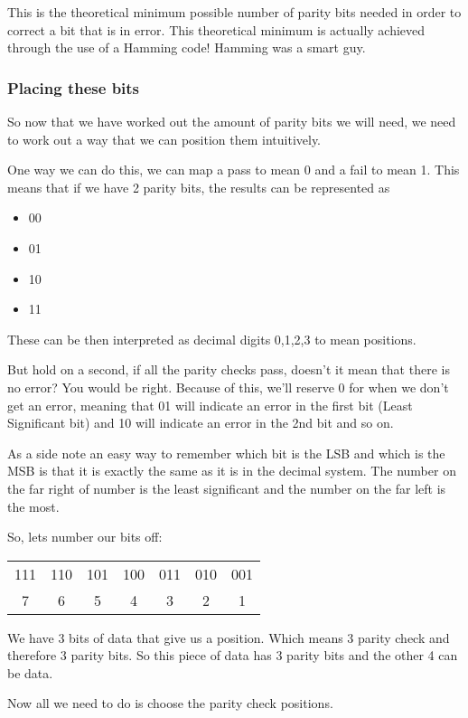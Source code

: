 \documentclass{article}
\begin{document}
  This is the theoretical minimum possible number of parity bits needed in order to correct a bit that is in error. This theoretical minimum is actually achieved through the use of a Hamming code! Hamming was a smart guy.

  \subsubsection*{Placing these bits}

  So now that we have worked out the amount of parity bits we will need, we need to work out a way that we can position them intuitively.

  One way we can do this, we can map a pass to mean 0 and a fail to mean 1. This means that if we have 2 parity bits, the results can be represented as

  \begin{itemize}
    \item 00
    \item 01
    \item 10
    \item 11
  \end{itemize}
  
  These can be then interpreted as decimal digits 0,1,2,3 to mean positions.

  But hold on a second, if all the parity checks pass, doesn't it mean that there is no error? You would be right. Because of this, we'll reserve 0 for when we don't get an error, meaning that 01 will indicate an error in the first bit (Least Significant bit) and 10 will indicate an error in the 2nd bit and so on.

   As a side note an easy way to remember which bit is the LSB and which is the MSB is that it is exactly the same as it is in the decimal system. The number on the far right of number is the least significant and the number on the far left is the most.

  So, lets number our bits off:

  \begin{tabular}{|c|c|c|c|c|c|c|}
    111&110&101&100&011&010&001 \\
     7 & 6 & 5 & 4 & 3 & 2 & 1
  \end {tabular}

   We have 3 bits of data that give us a position. Which means 3 parity check and therefore 3 parity bits. So this piece of data has 3 parity bits and the other 4 can be data.

   Now all we need to do is choose the parity check positions.
\end{document}
